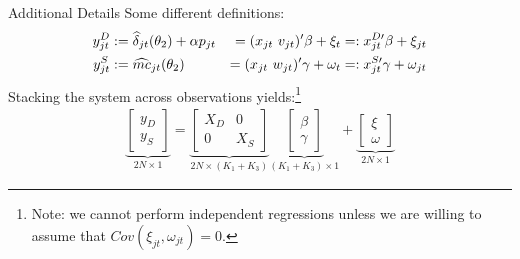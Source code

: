 \documentclass[xcolor=pdftex,dvipsnames,table,mathserif,aspectratio=169]{beamer}
\begin{document}
\begin{frame}{Additional Details}
Some different definitions:
\begin{alignat}{3}
\label{eq:stacked}
\nonumber y_{jt}^D &:= \widehat \delta_{jt}(\theta_2) + \alpha p_{jt} &=(x_{jt} \-\ v_{jt})' \beta + \xi_t &=: x_{jt}^{D\prime}\beta + \xi_{jt} \\ 
y_{jt}^S &:= \widehat{mc}_{jt}(\theta_2) &= (x_{jt} \-\ w_{jt})'\gamma + \omega_t &=: x_{jt}^{S\prime} \gamma + \omega_{jt} 
\end{alignat}
Stacking the system across observations yields:\footnote{Note: we cannot perform independent regressions unless we are willing to assume that $Cov(\xi_{jt},\omega_{jt})=0$.}
\begin{align}
\underbrace{\begin{bmatrix} y_D \\ y_S \end{bmatrix}}_{2N\times1} = 
\underbrace{\begin{bmatrix}
X_D & 0 \\
0 & X_S 
\end{bmatrix}}_{2N\times(K_1+K_3)}
\underbrace{\begin{bmatrix}
\beta \\ \gamma %
\end{bmatrix}}_{(K_1+K_3)\times1} + 
\underbrace{\begin{bmatrix}
\xi \\ \omega %
\end{bmatrix}}_{2N\times 1}
\end{align}
\end{frame}

%
%
%
%
\end{document}
